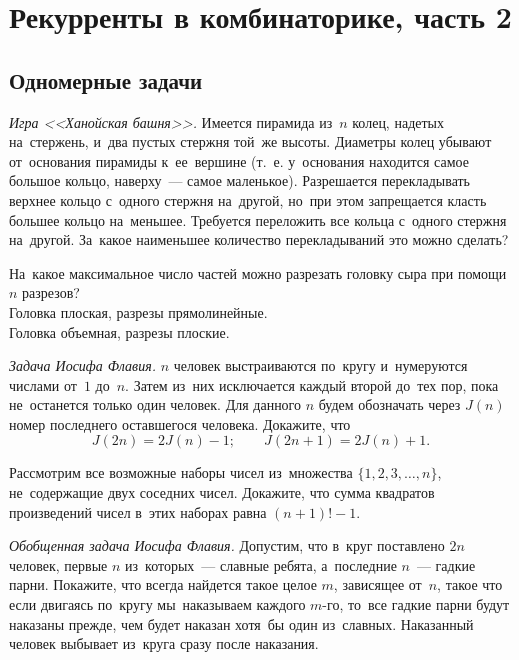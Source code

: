 

\section*{Рекурренты в комбинаторике, часть 2}



\subsection*{Одномерные задачи}

\begin{problems}

\item\emph{Игра <<Ханойская башня>>.}
Имеется пирамида из~$n$ колец, надетых на~стержень, и~два пустых стержня той~же
высоты.
Диаметры колец убывают от~основания пирамиды к~ее~вершине
(т.~е. у~основания находится самое большое кольцо, наверху~---
самое маленькое).
Разрешается перекладывать верхнее кольцо с~одного стержня на~другой,
но~при этом запрещается класть большее кольцо на~меньшее.
Требуется переложить все кольца с~одного стержня на~другой.
За~какое наименьшее количество перекладываний это можно сделать?

\item
На~какое максимальное число частей можно разрезать головку сыра при помощи
$n$ разрезов?
\\
\sbp Головка плоская, разрезы прямолинейные.
\\
\sbp Головка объемная, разрезы плоские.

\item\emph{Задача Иосифа Флавия.}
$n$ человек выстраиваются по~кругу и~нумеруются числами от~$1$ до~$n$.
Затем из~них исключается каждый второй до~тех пор, пока не~останется только
один человек.
Для данного $n$ будем обозначать через $J(n)$ номер последнего оставшегося
человека.
Докажите, что
\[
    J(2 n) = 2 J(n) - 1
;\qquad
    J(2 n + 1) = 2 J(n) + 1
.\]

\item
Рассмотрим все возможные наборы чисел из~множества $\{ 1, 2, 3, \ldots, n \}$,
не~содержащие двух соседних чисел.
Докажите, что сумма квадратов произведений чисел в~этих наборах равна
$(n + 1)! - 1$.

\item\emph{Обобщенная задача Иосифа Флавия.}
Допустим, что в~круг поставлено $2 n$ человек, первые $n$ из~которых~---
славные ребята, а~последние $n$~--- гадкие парни.
Покажите, что всегда найдется такое целое $m$, зависящее от~$n$, такое что
если двигаясь по~кругу мы~наказываем каждого $m$-го, то~все гадкие парни будут
наказаны прежде, чем будет наказан хотя~бы один из~славных.
Наказанный человек выбывает из~круга сразу после наказания.


\end{problems}
